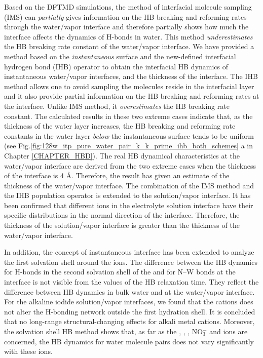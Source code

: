 Based on the DFTMD simulations, the method of interfacial molecule sampling (IMS) can \emph{partially} gives information on the HB breaking and reforming
rates through the water/vapor interface and therefore partially shows how much the interface affects the dynamics of H-bonds in water. 
This method \emph{underestimates} the HB breaking rate constant of the water/vapor interface. 
We have provided a method based on the \emph{instantaneous} surface and the new-defined
interfacial hydrogen bond (IHB) operator to obtain the interfacial HB dynamics of instantaneous water/vapor interfaces, and the thickness of the interface.  
The IHB method allows one to avoid sampling the molecules reside in the interfacial layer and
it also provide partial information on the HB breaking and reforming rates at the interface. 
Unlike IMS method, it \emph{overestimates} the HB breaking rate constant. The calculated results in these two extreme cases indicate that,
as the thickness of the water layer increases,
the HB breaking and reforming rate constants in the water layer \emph{below} the instantaneous surface tends to be uniform 
(see Fig.\thinspace\ref{fig:128w_itp_pure_water_pair_k_k_prime_ihb_both_schemes} a in Chapter \ref{CHAPTER_HBD}). 
The real HB dynamical characteristics at the water/vapor interface 
are derived from the two extreme cases when the thickness of the interface is 4 \AA. 
Therefore, the result has given an estimate of the thickness of the water/vapor interface.  
The combination of the IMS method and the IHB population operator is extended to the solution/vapor interface. 
It has been confirmed that different ions in the electrolyte solution interface have their specific distributions in the normal direction of the interface. 
Therefore, the thickness of the solution/vapor interface is greater than the thickness of the water/vapor interface. 

In addition, the concept of instantaneous interface has been extended to analyze the first solvation shell around the ions.
The difference between the HB dynamics for H-bonds in the second solvation shell of the \Li and for N--W bonds 
at the interface is not visible from the values of the HB relaxation time. They reflect the difference between HB dynamics in 
bulk water and at the water/vapor interface. For the alkaline iodide solution/vapor interfaces, we found 
that the cations does not alter the H-bonding network outside the first hydration shell. 
It is concluded that no long-range structural-changing effects for alkali metal cations.
Moreover, the solvation shell HB method shows that, 
as far as the \Li, \Na, \K, NO$^-_3$ and \I ions are concerned, 
the HB dynamics for water molecule pairs does not vary significantly with these ions.

